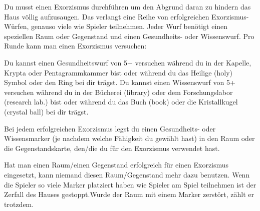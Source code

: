 





Du musst einen Exorzismus durchführen um den Abgrund daran zu hindern das Haus völlig aufzusaugen. Das verlangt eine Reihe von erfolgreichen Exorzismus-Würfen, genauso viele wie Spieler teilnehmen. Jeder Wurf benötigt einen speziellen Raum oder Gegenstand und einen Gesundheits- oder Wissenswurf. Pro Runde kann man einen Exorzismus versuchen:
  \begin{itemize}
        \bitem Du kannst einen Gesundheitswurf von 5+ versuchen während du in der Kapelle, Krypta oder Pentagrammkammer bist oder während du das Heilige (holy) Symbol oder den Ring bei dir trägst.
        \bitem Du kannst einen Wissenswurf von 5+ versuchen während du in der Bücherei (library) oder dem Forschungslabor (research lab.) bist oder während du das Buch (book) oder die Kristallkugel (crystal ball) bei dir trägst.
    \end{itemize}
Bei jedem erfolgreichen Exorzismus legst du einen Gesundheits- oder Wissensmarker (je nachdem welche Fähigkeit du gewählt hast) in den Raum oder die Gegenstandskarte, den/die du für den Exorzismus verwendet hast.

\newpage


Hat man einen Raum/einen Gegenstand erfolgreich für einen Exorzismus eingesetzt, kann niemand diesen Raum/Gegenstand mehr dazu benutzen. Wenn die Spieler so viele Marker platziert haben wie Spieler am Spiel teilnehmen ist der Zerfall des Hauses gestoppt.Wurde der Raum mit einem Marker zerstört, zählt er trotzdem.


